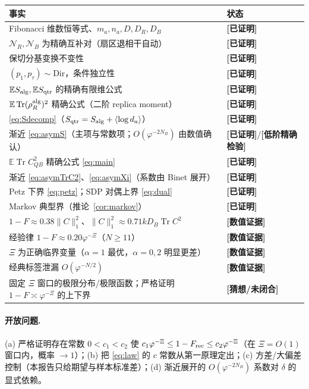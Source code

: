 \documentclass[11pt,a4paper]{ctexart}
\theoremstyle{definition}
\newcommand{\proved}{\textcolor{green!45!black}{\textbf{[已证明]}}}
\newcommand{\loword}{\textcolor{orange!80!black}{\textbf{[低阶精确检验]}}}
\newcommand{\numeric}{\textcolor{blue!70!black}{\textbf{[数值证据]}}}
\newcommand{\conj}{\textcolor{red!70!black}{\textbf{[猜想/未闭合]}}}
\newcommand{\Tr}{\operatorname{Tr}}
\newcommand{\E}{\mathbb{E}}
\newcommand{\ph}{\varphi}
\newcommand{\Nalg}{S_{\rm alg}}
\newcommand{\Nqtr}{S_{\rm qtr}}
\begin{document}
\begin{center}
\small\setlength{\tabcolsep}{4pt}\begin{tabular}{p{}l}
\toprule
事实 & 状态{}\\
\midrule
Fibonacci 维数恒等式、$m_a,n_a,D,D_R,D_B$ & \proved\\
$\mathcal N_R,\mathcal N_B$ 为精确互补对（扇区退相干自动） & \proved\\
保切分基变换不变性 & \proved\\
$(p_1,p_\tau)\sim\mathrm{Dir}$，条件独立性 & \proved\\
$\E\Nalg,\E\Nqtr$ 的精确有限维公式 & \proved\\
$\E\Tr(\rho_R^{\rm alg})^2$ 精确公式（二阶 replica moment） & \proved\\
\eqref{eq:Sdecomp}（$S_{\rm qtr}=S_{\rm alg}+\langle\log d_a\rangle$） & \proved\\
渐近 \eqref{eq:asymS}（主项与常数项；$O(\ph^{-2N_B})$ 由数值确认） & \proved/\loword\\
$\E\Tr C_{QB}^2$ 精确公式 \eqref{eq:main} & \proved\\
渐近 \eqref{eq:asymTrC2}、\eqref{eq:asymXi}（系数由 Binet 展开） & \proved\\
Petz 下界 \eqref{eq:petz}；SDP 对偶上界 \eqref{eq:dual} & \proved\\
Markov 典型界（推论~\ref{cor:markov}） & \proved\\
$1-F\approx0.38\|C\|_1^2$、$\|C\|_1^2\approx0.71kD_B\Tr C^2$ & \numeric\\
经验律 $1-F\approx0.20\ph^{-\Xi}$（$N\ge11$） & \numeric\\
$\Xi$ 为正确临界变量（$\alpha=1$ 最优，$\alpha=0,2$ 明显更差） & \numeric\\
经典标签泄漏 $O(\ph^{-N/2})$ & \numeric\\
固定 $\Xi$ 窗口的极限分布/极限函数；严格证明 $1-F\asymp\ph^{-\Xi}$ 的上下界 & \conj\\
\bottomrule
\end{tabular}
\end{center}

\paragraph{开放问题.}
(a) 严格证明存在常数 $0<c_1<c_2$ 使 $c_1\ph^{-\Xi}\le1-F_{\rm rec}\le c_2\ph^{-\Xi}$（在 $\Xi=O(1)$ 窗口内，概率 $\to1$）；(b) 把 \eqref{eq:law} 的 $c$ 常数从第一原理定出；(c) 方差/大偏差控制（本报告只给期望与样本标准差）；(d) 渐近展开的 $O(\ph^{-2N_B})$ 系数对 $\delta$ 的显式依赖。
\end{document}
